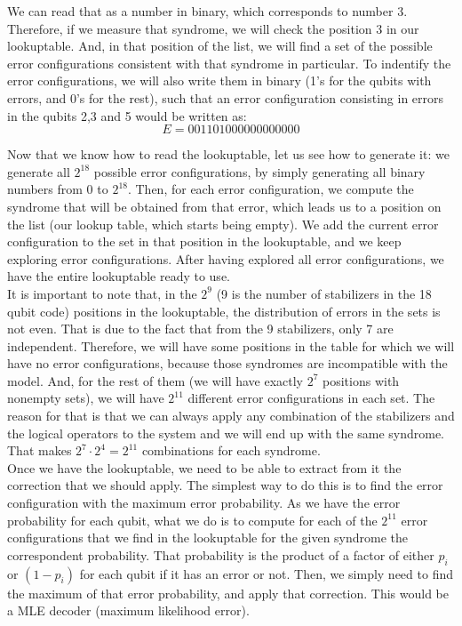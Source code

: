 \documentclass[a4paper,12pt]{article}
\begin{document}
We can read that as a number in binary, which corresponds to number 3. Therefore, if we measure that syndrome, we will check the position 3 in our lookuptable. And, in that position of the list, we will find a set of the possible error configurations consistent with that syndrome in particular. To indentify the error configurations, we will also write them in binary (1's for the qubits with errors, and 0's for the rest), such that an error configuration consisting in errors in the qubits 2,3 and 5 would be written as:
$$E=001101000000000000$$


Now that we know how to read the lookuptable, let us see how to generate it: we generate all $2^18$ possible error configurations, by simply generating all binary numbers from 0 to $2^18$. Then, for each error configuration, we compute the syndrome that will be obtained from that error, which leads us to a position on the list (our lookup table, which starts being empty). We add the current error configuration to the set in that position in the lookuptable, and we keep exploring error configurations. After having explored all error configurations, we have the entire lookuptable ready to use. \\

It is important to note that, in the $2^9$ (9 is the number of stabilizers in the 18 qubit code) positions in the lookuptable, the distribution of errors in the sets is not even. That is due to the fact that from the 9 stabilizers, only 7 are independent.  Therefore, we will have some positions in the table for which we will have no error configurations, because those syndromes are incompatible with the model. And, for the rest of them (we will have exactly $2^7$ positions with nonempty sets), we will have $2^11$ different error configurations in each set. The reason for that is that we can always apply any combination of the stabilizers and the logical operators to the system and we will end up with the same syndrome. That makes $2^7\cdot 2^4=2^11$ combinations for each syndrome.\\

Once we have the lookuptable, we need to be able to extract from it the correction that we should apply. The simplest way to do this is to find the error configuration with the maximum error probability. As we have the error probability for each qubit, what we do is to compute for each of the $2^11$ error configurations that we find in the lookuptable for the given syndrome the correspondent probability. That probability is the product of a factor of either $p_i$ or $(1-p_i)$ for each qubit if it has an error or not. Then, we simply need to find the maximum of that error probability, and apply that correction. This would be a MLE decoder (maximum likelihood error).\\
\end{document}
